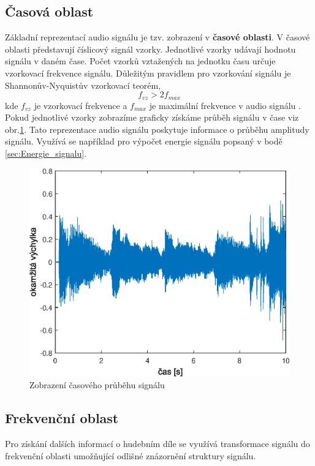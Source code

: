   \subsection{Časová oblast}
  Základní reprezentací audio signálu je tzv. zobrazení v \textbf{časové oblasti}.
  V časové oblasti představují číslicový signál vzorky. Jednotlivé vzorky udávají hodnotu signálu v daném čase.
  Počet vzorků vztažených na jednotku času určuje vzorkovací frekvence signálu.
  Důležitým pravidlem pro vzorkování signálu je Shannonův-Nyquistův vzorkovací teorém,
  \begin{equation}
    f_{vz} > 2f_{max}
    \label{rov:vzorkovaci_teorem}
  \end{equation}
  kde $f_{vz}$ je vzorkovací frekvence a $f_{max}$ je maximální frekvence v audio signálu \cite{bracewell1978fourier}.  
  Pokud jednotlivé vzorky zobrazíme graficky získáme průběh signálu v čase viz obr.\ref{fig:Waveform}. Tato reprezentace audio signálu poskytuje informace o průběhu amplitudy signálu. Využívá se například pro výpočet energie signálu popsaný v bodě \ref{sec:Energie_signalu}.

  \begin{figure}[H]
    \centering
    \includegraphics[width = 0.8\linewidth]{obrazky/Waveform.eps}
    \caption{Zobrazení časového průběhu signálu}
    \label{fig:Waveform}
  \end{figure}
  
  \subsection{Frekvenční oblast} \label{sec:FT}
  Pro získání dalších informací o hudebním díle se využívá transformace signálu do frekvenční oblasti umožňující odlišné znázornění struktury signálu.

